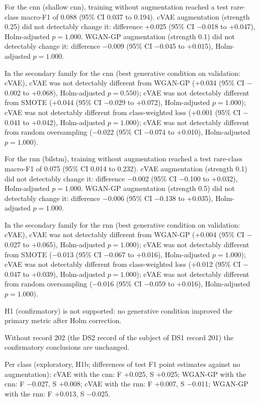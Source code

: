For the cnn (shallow cnn), training without augmentation reached a test rare-class macro-F1 of 0.088 (95\% CI 0.037 to 0.194). cVAE augmentation (strength 0.25) did not detectably change it: difference +0.025 (95\% CI $-$0.018 to +0.047), Holm-adjusted $p=1.000$. WGAN-GP augmentation (strength 0.1) did not detectably change it: difference $-$0.009 (95\% CI $-$0.045 to +0.015), Holm-adjusted $p=1.000$.

In the secondary family for the cnn (best generative condition on validation: cVAE), cVAE was not detectably different from WGAN-GP (+0.034 (95\% CI $-$0.002 to +0.068), Holm-adjusted $p=0.550$); cVAE was not detectably different from SMOTE (+0.044 (95\% CI $-$0.029 to +0.072), Holm-adjusted $p=1.000$); cVAE was not detectably different from class-weighted loss (+0.001 (95\% CI $-$0.041 to +0.042), Holm-adjusted $p=1.000$); cVAE was not detectably different from random oversampling ($-$0.022 (95\% CI $-$0.074 to +0.010), Holm-adjusted $p=1.000$).

For the rnn (bilstm), training without augmentation reached a test rare-class macro-F1 of 0.075 (95\% CI 0.014 to 0.232). cVAE augmentation (strength 0.1) did not detectably change it: difference $-$0.002 (95\% CI $-$0.100 to +0.032), Holm-adjusted $p=1.000$. WGAN-GP augmentation (strength 0.5) did not detectably change it: difference $-$0.006 (95\% CI $-$0.138 to +0.035), Holm-adjusted $p=1.000$.

In the secondary family for the rnn (best generative condition on validation: cVAE), cVAE was not detectably different from WGAN-GP (+0.004 (95\% CI $-$0.027 to +0.065), Holm-adjusted $p=1.000$); cVAE was not detectably different from SMOTE ($-$0.013 (95\% CI $-$0.067 to +0.016), Holm-adjusted $p=1.000$); cVAE was not detectably different from class-weighted loss (+0.012 (95\% CI $-$0.047 to +0.039), Holm-adjusted $p=1.000$); cVAE was not detectably different from random oversampling ($-$0.016 (95\% CI $-$0.059 to +0.016), Holm-adjusted $p=1.000$).

H1 (confirmatory) is not supported: no generative condition improved the primary metric after Holm correction.

Without record 202 (the DS2 record of the subject of DS1 record 201) the confirmatory conclusions are unchanged.

Per class (exploratory, H1b; differences of test F1 point estimates against no augmentation): cVAE with the cnn: F +0.025, S +0.025; WGAN-GP with the cnn: F $-$0.027, S +0.008; cVAE with the rnn: F +0.007, S $-$0.011; WGAN-GP with the rnn: F +0.013, S $-$0.025.
